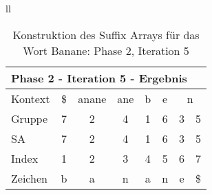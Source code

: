 \begin{table}[H]
\begin{adjustbox}{max width=\textwidth}
\begin{tabular}{ll}
\begin{tabular}{lccccccc}
\multicolumn{8}{l}{Phase 2 - Iteration 5 - Ergebnis}                                                                                                                                            \\ \hline
\multicolumn{1}{l|}{Kontext} & \multicolumn{1}{c|}{\$} & \multicolumn{1}{c|}{anane} & \multicolumn{1}{c|}{ane} & \multicolumn{1}{c|}{b} & \multicolumn{1}{c|}{e} & \multicolumn{2}{c}{n}        \\
\multicolumn{1}{l|}{Gruppe}  & \multicolumn{1}{c|}{7}  & \multicolumn{1}{c|}{2}     & \multicolumn{1}{c|}{4}   & \multicolumn{1}{c|}{1} & \multicolumn{1}{c|}{6} & 3 & 5                         \\ 
\multicolumn{1}{l|}{SA}      & \multicolumn{1}{c|}{7}  & \multicolumn{1}{c|}{2}     & \multicolumn{1}{c|}{4}   & \multicolumn{1}{c|}{1} & \multicolumn{1}{c|}{6} & 3 & \cellcolor[HTML]{\yellow}5 \\ \hline
\multicolumn{1}{l|}{Index}   & 1                       & 2                          & 3                        & 4                      & 5                      & 6 & 7                         \\
\multicolumn{1}{l|}{Zeichen} & b                       & a                          & n                        & a                      & n                      & e & \$                       
\end{tabular}

\end{tabular}
\end{adjustbox}

\caption[Konstruktion des Suffix Arrays f{\"u}r das Wort Banane: Phase 2, Iteration 5]{Konstruktion des Suffix Arrays f{\"u}r das Wort Banane: Phase 2, Iteration 5}
\label{fig_banane_2_5} 
\end{table}
